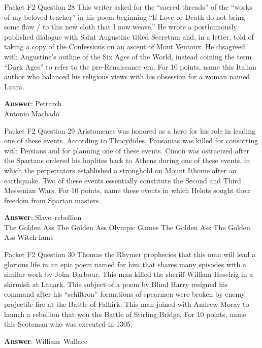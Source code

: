 \begin{frame}{Packet F2 Question 28}
This writer asked for   the “sacred threads” of the “works of my beloved teacher” in his poem beginning “If Love or Death do not bring some flaw / to this new cloth that I now weave.” He wrote a posthumously published dialogue with Saint Augustine titled Secretum       and, in a letter, told of taking a copy of the Confessions on an ascent of Mont   Ventoux. He disagreed with Augustine’s outline of the Six Ages of the World, instead coining the term “Dark Ages” to refer to the pre-Renaissance era. For 10 points, name this Italian author who balanced his religious views with his obsession for a woman named Laura.

\textbf{Answer}: Petrarch\\
 Antonio Machado
\end{frame}

\begin{frame}{Packet F2 Question 29}
Aristomenes was honored     as a hero for his role in leading one of these events. According to Thucydides, Pausanias was killed for consorting with Persians and for planning one of these events. Cimon was ostracized after the Spartans ordered his hoplites back to Athens during one of these events, in which the perpetrators established a stronghold on Mount Ithome after an earthquake. Two of these events essentially constitute the Second and Third Messenian Wars. For 10 points, name these events in which Helots sought their freedom from Spartan masters.        

\textbf{Answer}: Slave\ rebellion\\
 The Golden Ass
 The Golden Ass
 Olympic Games
 The Golden Ass
 The Golden Ass
 Witch-hunt
\end{frame}

\begin{frame}{Packet F2 Question 30}
Thomas the Rhymer prophecies that this man will lead a glorious life in an epic poem named for him that shares many episodes with a similar work by John Barbour. This man killed the sheriff William Heselrig in a skirmish at Lanark. This subject   of a poem by Blind Harry resigned his   command after his “schiltron”   formations of spearmen were broken by enemy projectile fire at the Battle of Falkirk. This man joined with Andrew Moray to launch a rebellion that won the Battle of Stirling Bridge. For 10   points, name this Scotsman who was executed in 1305.

\textbf{Answer}: William\ Wallace\\
\end{frame}

